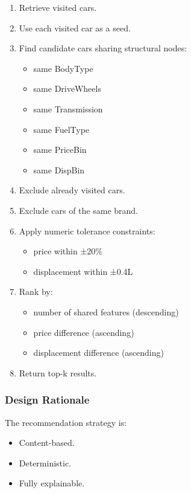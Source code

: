 \begin{enumerate}
    \item Retrieve visited cars.
    \item Use each visited car as a seed.
    \item Find candidate cars sharing structural nodes:
    \begin{itemize}
        \item same BodyType
        \item same DriveWheels
        \item same Transmission
        \item same FuelType
        \item same PriceBin
        \item same DispBin
    \end{itemize}
    \item Exclude already visited cars.
    \item Exclude cars of the same brand.
    \item Apply numeric tolerance constraints:
    \begin{itemize}
        \item price within ±20\%
        \item displacement within ±0.4L
    \end{itemize}
    \item Rank by:
    \begin{itemize}
        \item number of shared features (descending)
        \item price difference (ascending)
        \item displacement difference (ascending)
    \end{itemize}
    \item Return top-k results.
\end{enumerate}

\subsubsection*{Design Rationale}

The recommendation strategy is:

\begin{itemize}
    \item Content-based.
    \item Deterministic.
    \item Fully explainable.
\end{itemize}

